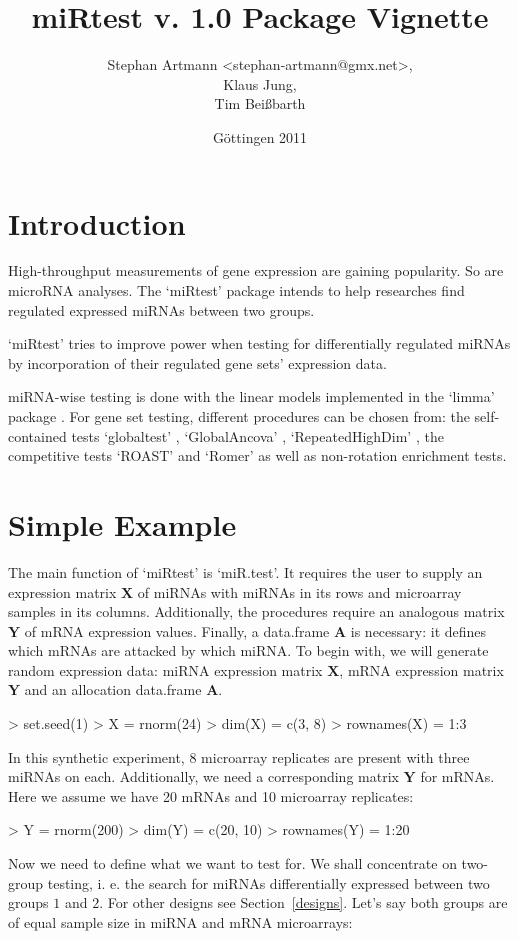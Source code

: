 \documentclass[12pt]{article}
\title{miRtest v. 1.0 Package Vignette}
\author{Stephan Artmann <stephan-artmann@gmx.net>,\\Klaus Jung,\\Tim Bei\ss barth}
\date{G\"ottingen 2011}
\begin{document}
\maketitle
\tableofcontents
\section{Introduction}
High-throughput measurements of gene expression are gaining popularity. So are microRNA analyses. The `miRtest' package \cite[] {detection_artmann_submitted} intends to help researches find regulated expressed miRNAs between two groups.

`miRtest' tries to improve power when testing for differentially regulated miRNAs by incorporation of their regulated gene sets' expression data.

miRNA-wise testing is done with the linear models implemented in the `limma' package \cite[] {smyth_gordon_k_linear_2004}. For gene set testing, different procedures can be chosen from: the self-contained tests `globaltest' \cite[] {goeman_global_2004}, `GlobalAncova' \cite[]{mansmann_testing_2005,hummel_globalancova:_2008}, `RepeatedHighDim' \citep{jung_comparison_submitted,brunner_repeated_2009}, the competitive tests `ROAST' \cite[]{wu_roast:_2010} and `Romer' \cite[]{majewski_opposing_2010} as well as non-rotation enrichment tests.
\section{Simple Example}
The main function of `miRtest' is `miR.test'. It requires the user to supply an expression matrix $\boldsymbol{X}$ of miRNAs with miRNAs in its rows and microarray samples in its columns. Additionally, the procedures require an analogous matrix $\boldsymbol{Y}$ of mRNA expression values. Finally, a data.frame $\boldsymbol{A}$ is necessary: it defines which mRNAs are attacked by which miRNA.
To begin with, we will generate random expression data: miRNA expression matrix $\boldsymbol{X}$, mRNA expression matrix $\boldsymbol{Y}$ and an allocation data.frame $\boldsymbol{A}$.
\begin{Schunk}
\begin{Sinput}
> set.seed(1)
> X = rnorm(24)
> dim(X) = c(3, 8)
> rownames(X) = 1:3
\end{Sinput}
\end{Schunk}
In this synthetic experiment, 8 microarray replicates are present with three miRNAs on each. Additionally, we need a corresponding matrix $\boldsymbol{Y}$ for mRNAs. Here we assume we have 20 mRNAs and 10 microarray replicates:
\begin{Schunk}
\begin{Sinput}
> Y = rnorm(200)
> dim(Y) = c(20, 10)
> rownames(Y) = 1:20
\end{Sinput}
\end{Schunk}
Now we need to define what we want to test for. We shall concentrate on two-group testing, i. e. the search for miRNAs differentially expressed between two groups $1$ and $2$. For other designs see Section~\ref{designs}. Let's say both groups are of equal sample size in miRNA and mRNA microarrays:
\end{document}
